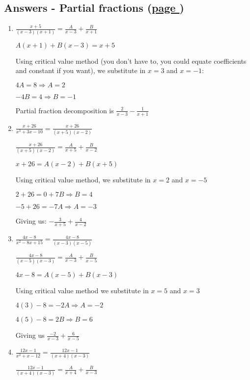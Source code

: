 \documentclass[../main.tex]{subfiles}
\begin{document}
\hypertarget{partialfractionsanswers}{\subsection*{Answers - Partial fractions (\hyperlink{partialfractionslink}{page \pageref{partial fractions}})}}

\label{Partial fractions answers}
\begin{enumerate}[itemsep=0.7cm]
    \item 
    $\frac{x+5}{(x-3)(x+1)}=\frac{A}{x-3}+\frac{B}{x+1}$

    $A(x+1)+B(x-3)=x+5$

    Using critical value method (you don't have to, you could equate coefficients and constant if you want), we substitute in $x=3$ and $x=-1$:

    $4A=8 \Rightarrow A=2$

    $-4B=4 \Rightarrow B=-1$

    Partial fraction decomposition is $\frac{2}{x-3}-\frac{1}{x+1}$

    \item 
    $\frac{x+26}{x^3+3x-10}=\frac{x+26}{(x+5)(x-2)}$

    $\frac{x+26}{(x+5)(x-2)}=\frac{A}{x+5}+\frac{B}{x-2}$

    $x+26=A(x-2)+B(x+5)$

    Using critical value method, we substitute in $x=2$ and $x=-5$

    $2+26=0+7B \Rightarrow B=4$

    $-5+26=-7A \Rightarrow A=-3$

    Giving us: $-\frac{3}{x+5}+\frac{4}{x-2}$

    \item 
    $\frac{4x-8}{x^2-8x+15}=\frac{4x-8}{(x-3)(x-5)}$

    $\frac{4x-8}{(x-5)(x-3)}=\frac{A}{x-3}+\frac{B}{x-5}$

    $4x-8=A(x-5)+B(x-3)$

    Using critical value method we substitute in $x=5$ and $x=3$

    $4(3)-8=-2A \Rightarrow A=-2$

    $4(5)-8=2B \Rightarrow B=6$

    Giving us $\frac{-2}{x-3}+\frac{6}{x-5}$

    \item 
    $\frac{12x-1}{x^2+x-12}=\frac{12x-1}{(x+4)(x-3)}$

    $\frac{12x-1}{(x+4)(x-3)}=\frac{A}{x+4}+\frac{B}{x-3}$


\end{enumerate}
\end{document}
